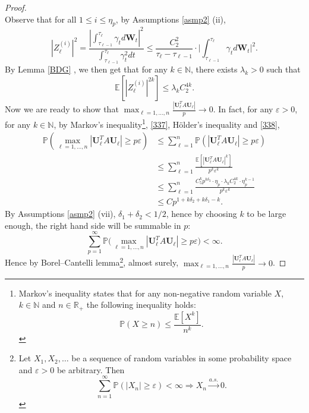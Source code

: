 \documentclass[a4paper,11pt]{article}
\theoremstyle{plain}
\theoremstyle{definition}
\newcommand{\ME}{\mathbb{E}}
\newcommand{\MR}{\mathbb{R}}
\newcommand{\MP}{\mathbb{P}}
\newcommand{\MN}{\mathbb{N}}
\begin{document}
\begin{proof}
\begin{equation}
    	\end{equation}
    	Observe that for all $1 \leq i \leq \eta_p$, by Assumptions \ref{asmp2} (ii),
    	\[ | Z_\ell^{(i)} |^2 = \frac{|\int_{\tau_{\ell-1}}^{\tau_\ell} \gamma_t d\mathbf{W}_t|^2}{\int_{\tau_{\ell-1}}^{\tau_\ell} \gamma_t^2 dt} \leq \frac{C_2^2}{\tau_\ell-\tau_{\ell-1} } \cdot \Bigg|\int_{\tau_{\ell-1}}^{\tau_\ell} \gamma_t d\mathbf{W}_t \Bigg|^2. \] 
    	By Lemma \ref{BDG} , we then get that for any $k \in \MN$, there exists $\lambda_k > 0$ such that
    	\begin{equation} \label{338}
    		\ME[ |Z_\ell^{(i)}|^{2k} ] \leq \lambda_k C_2^{4k}.
    	\end{equation}
    	Now we are ready to show that $\max_{\ell = 1, \dots, n} \frac{| \mathbf{U}_\ell^T A \mathbf{U}_\ell |}{p} \rightarrow 0 $. In fact, for any $\varepsilon > 0$, for any $k \in \MN$, by Markov's inequality\footnote{
    		Markov's inequality states that for any non-negative random variable $X$, $k \in \MN$ and $n \in \MR_+$ the following inequality holds:
    		\[ \MP(X \geq n) \leq \frac{\ME[X^k]}{n^k}. \]
    		}, \eqref{337}, H\"older's inequality and \eqref{338},
    	\[ 
    	\begin{aligned}
    	\MP(\max_{\ell = 1, \dots, n} | \mathbf{U}_\ell^T A \mathbf{U}_\ell | \geq p\varepsilon) & \leq \sum_{\ell=1}^{n} \MP(|\mathbf{U}_\ell^T A \mathbf{U}_\ell | \geq p\varepsilon) \\
    	& \leq \sum_{\ell=1}^{n} \frac{\ME[ |\mathbf{U}_\ell^T A \mathbf{U}_\ell|^k ]}{ p^k \varepsilon^k } \\
    	& \leq \sum_{\ell=1}^{n} \frac{ C_5^k p^{k \delta_2}  \cdot \eta_p \cdot \lambda_k C_2^{4k} \cdot \eta_p^{k-1} }{p^k\varepsilon^k} \\
    	& \leq C p^{1+k\delta_2 + k\delta_1 - k}.
    	\end{aligned}
    	 \]
    	 By Assumptions \ref{asmp2} (vii), $\delta_1 + \delta_2 < 1/2$, hence by choosing $k$ to be large enough, the right hand side will be summable in $p$: 
    	 \[ \sum_{p=1}^{\infty} \MP\big(\max_{\ell = 1, \dots, n} | \mathbf{U}_\ell^T A \mathbf{U}_\ell | \geq p\varepsilon\big) < \infty. \]
    	 Hence by Borel–Cantelli lemma\footnote{
    	 	Let $X_1, X_2, \dots$ be a sequence of random variables in some probability space and $\varepsilon > 0$ be arbitrary.
    	 	Then
    	 	\[ \sum_{n=1}^{\infty} \MP(|X_n| \geq \varepsilon) < \infty \Longrightarrow X_n \xrightarrow{a.s.} 0.  \]
    	 	}, almost surely, $\max_{\ell = 1, \dots, n} \frac{| \mathbf{U}_\ell^T A \mathbf{U}_\ell |}{p} \rightarrow 0$.

\end{proof}
\end{document}
